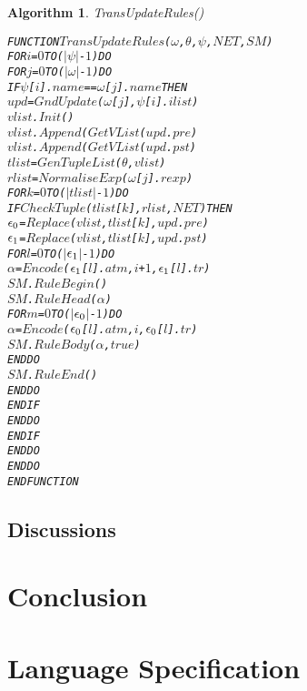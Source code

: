 \documentclass[11pt]{report}
\newenvironment{vverbatim}
{
  \begin{alltt}
}
{
    \vspace{-\baselineskip}
  \end{alltt}
}
\newtheorem{vvalgorithm}{Algorithm}[chapter]
\newenvironment{valgorithm}[2]
{
  \begin{vvalgorithm}{#1}
    \label{#2}
    \small
    \begin{vverbatim}
}
{
    \end{vverbatim}
  \end{vvalgorithm}
}
\begin{document}
          \begin{valgorithm}{TransUpdateRules()}{algo-impln-traup}
FUNCTION \(TransUpdateRules\)(\(\omega\), \(\theta\), \(\psi\), \(NET\), \(SM\))
  FOR \(i\) = \(0\) TO (\(|\psi|\) - \(1\)) DO
    FOR \(j\) = \(0\) TO (\(|\omega|\) - \(1\)) DO
      IF \(\psi\)[\(i\)].\(name\) == \(\omega\)[\(j\)].\(name\) THEN
        \(upd\) = \(GndUpdate\)(\(\omega\)[\(j\)], \(\psi\)[\(i\)].\(ilist\))
        \(vlist\).\(Init\)()
        \(vlist\).\(Append\)(\(GetVList\)(\(upd\).\(pre\))
        \(vlist\).\(Append\)(\(GetVList\)(\(upd\).\(pst\))
        \(tlist\) = \(GenTupleList\)(\(\theta\), \(vlist\))
        \(rlist\) = \(NormaliseExp\)(\(\omega\)[\(j\)].\(rexp\))
        FOR \(k\) = \(0\) TO (\(|tlist|\) - \(1\)) DO
          IF \(CheckTuple\)(\(tlist\)[\(k\)], \(rlist\), \(NET\)) THEN
            \(\epsilon\sb{0}\) = \(Replace\)(\(vlist\), \(tlist\)[\(k\)], \(upd\).\(pre\))
            \(\epsilon\sb{1}\) = \(Replace\)(\(vlist\), \(tlist\)[\(k\)], \(upd\).\(pst\))
            FOR \(l\) = \(0\) TO (\(|\)\(\epsilon\sb{1}\)\(|\) - \(1\)) DO
              \(\alpha\) = \(Encode\)(\(\epsilon\sb{1}\)[\(l\)].\(atm\), \(i\) + \(1\), \(\epsilon\sb{1}\)[\(l\)].\(tr\))
              \(SM\).\(RuleBegin\)()
              \(SM\).\(RuleHead\)(\(\alpha\))
              FOR \(m\) = \(0\) TO (\(|\)\(\epsilon\sb{0}\)\(|\) - \(1\)) DO
                \(\alpha\) = \(Encode\)(\(\epsilon\sb{0}\)[\(l\)].\(atm\), \(i\), \(\epsilon\sb{0}\)[\(l\)].\(tr\))
                \(SM\).\(RuleBody\)(\(\alpha\), \(true\))
              ENDDO
              \(SM\).\(RuleEnd\)()
            ENDDO
          ENDIF
        ENDDO
      ENDIF
    ENDDO
  ENDDO
ENDFUNCTION
          \end{valgorithm}

    \section{Discussions}
      \label{sect-impln-discu}

  \chapter{Conclusion}
    \label{chap-concl}

  \appendix

  \chapter{Language Specification}
    \label{chap-langs}
\end{document}
